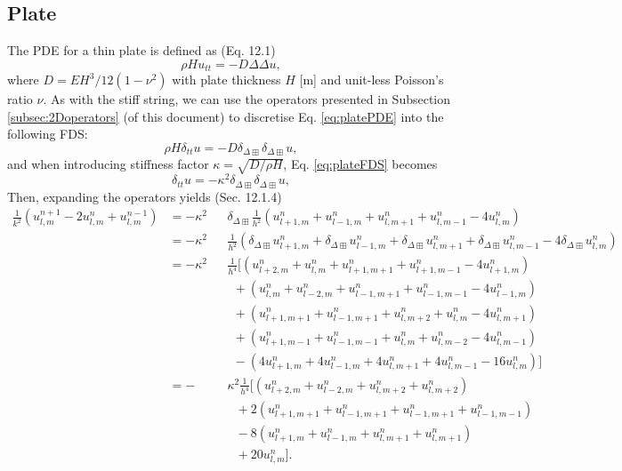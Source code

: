 \documentclass{article}
\begin{document}
\subsection{Plate}
The PDE for a thin plate is defined as (Eq. 12.1)
\begin{equation}\label{eq:platePDE}
    \rho H u_{tt} = -D\Delta\Delta u,
\end{equation}
where $D = EH^3/12(1-\nu^2)$ with plate thickness $H$ [m] and unit-less Poisson's ratio $\nu$. As with the stiff string, we can use the operators presented in Subsection \ref{subsec:2Doperators} (of this document) to discretise Eq. \eqref{eq:platePDE} into the following FDS: 
\begin{equation}\label{eq:plateFDS}
    \rho H \delta_{tt}u = -D\delta_{\Delta\boxplus}\delta_{\Delta\boxplus} u,
\end{equation}
and when introducing stiffness factor $\kappa =\sqrt{D/\rho H}$, Eq. \eqref{eq:plateFDS} becomes
\begin{equation}\label{eq:plateFDS}
    \delta_{tt}u = -\kappa^2\delta_{\Delta\boxplus}\delta_{\Delta\boxplus} u,
\end{equation}
Then, expanding the operators yields (Sec. 12.1.4)
\begin{equation}\nonumber
\begin{alignedat}{2}
    \frac{1}{k^2}(u_{l,m}^{n+1}-2u_{l,m}^n+u_{l,m}^{n-1}) &=-\kappa^2&&\delta_{\Delta\boxplus}\frac{1}{h^2}(u_{l+1, m}^n + u_{l-1, m}^n + u_{l, m+1}^n + u_{l, m-1}^n - 4 u_{l, m}^n)\\
    &=-\kappa^2&&\frac{1}{h^2}(\delta_{\Delta\boxplus}u_{l+1, m}^n + \delta_{\Delta\boxplus}u_{l-1, m}^n + \delta_{\Delta\boxplus}u_{l, m+1}^n + \delta_{\Delta\boxplus}u_{l, m-1}^n - 4 \delta_{\Delta\boxplus}u_{l, m}^n)\\
    &=-\kappa^2&&\frac{1}{h^4}\big[(u_{l+2, m}^n + u_{l, m}^n + u_{l+1, m+1}^n + u_{l+1, m-1}^n - 4 u_{l+1, m}^n)\\
    & &&\: \:+(u_{l, m}^n + u_{l-2, m}^n + u_{l-1, m+1}^n + u_{l-1, m-1}^n - 4 u_{l-1, m}^n)\\
    & &&\: \:+(u_{l+1, m+1}^n + u_{l-1, m+1}^n + u_{l, m+2}^n + u_{l, m}^n - 4 u_{l, m+1}^n)
    \\
    & &&\: \:+(u_{l+1, m-1}^n + u_{l-1, m-1}^n + u_{l, m}^n + u_{l, m-2}^n - 4 u_{l, m-1}^n)\\
    & &&\: \:-(4u_{l+1, m}^n + 4u_{l-1, m}^n + 4u_{l, m+1}^n + 4u_{l, m-1}^n - 16 u_{l, m}^n)\big]\\
    &=-&&\kappa^2\frac{1}{h^4}\big[(u_{l+2, m}^n + u_{l-2, m}^n+u_{l, m+2}^n+u_{l, m+2}^n)\\
    & &&\ \ \ +2(u_{l+1, m+1}^n + u_{l-1, m+1}^n+u_{l-1, m+1}^n+u_{l-1, m-1}^n)\\
    & &&\ \ \ -8(u_{l+1, m}^n + u_{l-1, m}^n+u_{l, m+1}^n+u_{l, m+1}^n)\\
    & &&\ \ \ +20u_{l,m}^n\big].
    \end{alignedat}
\end{equation}
\end{document}
